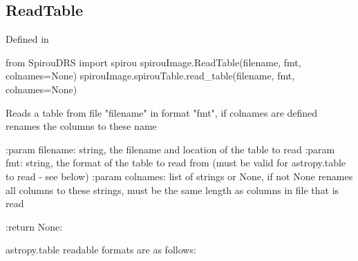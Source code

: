 \begin{minipage}{\textwidth}
\subsection{ReadTable}

Defined in \spirouImage{}

\begin{pythonbox}
from SpirouDRS import spirou
spirouImage.ReadTable(filename, fmt, colnames=None)
spirouImage.spirouTable.read_table(filename, fmt, colnames=None)
\end{pythonbox}

\begin{pythondocstring}
Reads a table from file "filename" in format "fmt", if colnames are defined
renames the columns to these name

:param filename: string, the filename and location of the table to read
:param fmt: string, the format of the table to read from (must be valid
            for astropy.table to read - see below)
:param colnames: list of strings or None, if not None renames all columns
                 to these strings, must be the same length as columns
                 in file that is read

:return None:

astropy.table readable formats are as follows:
\end{pythondocstring}
\end{minipage}


